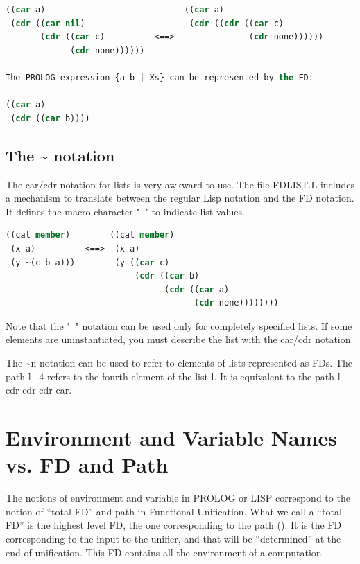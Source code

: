 \documentclass[10pt,a4paper]{report}
\begin{document}
\begin{appendices}
\begin{lstlisting}[language=Lisp]
((car a)                            ((car a)
 (cdr ((car nil)                     (cdr ((cdr ((car c)
       (cdr ((car c)          <==>               (cdr none))))))
             (cdr none))))))

The PROLOG expression {a b | Xs} can be represented by the FD:

((car a)
 (cdr ((car b))))
\end{lstlisting}

\subsection{The \~{} notation}

The car/cdr notation for lists is very awkward to use. The file
FDLIST.L includes a mechanism to translate between the regular
Lisp notation and the FD notation. It defines the macro-character
"~" to indicate list values.

\begin{lstlisting}[language=Lisp]
((cat member)        ((cat member)
 (x a)          <==>  (x a)
 (y ~(c b a)))        (y ((car c)
                          (cdr ((car b)
                                (cdr ((car a)
                                      (cdr none))))))))
\end{lstlisting}

Note that the "~" notation can be used only for completely
specified lists. If some elements are uninstantiated, you must
describe the list with the car/cdr notation.

The \~{}n notation can be used to refer to elements of lists represented as
FDs.  The path {l ~4} refers to the fourth element of the list l.  It is
equivalent to the path {l cdr cdr cdr car}.


\section{Environment and Variable Names vs. FD and Path}

The notions of environment and variable in PROLOG or LISP
correspond to the notion of ``total FD'' and path in Functional
Unification. What we call a ``total FD'' is the highest level FD,
the one corresponding to the path (). It is the FD corresponding
to the input to the unifier, and that will be ``determined'' at the
end of unification. This FD contains all the environment of a
computation.  


\end{appendices}
\end{document}
